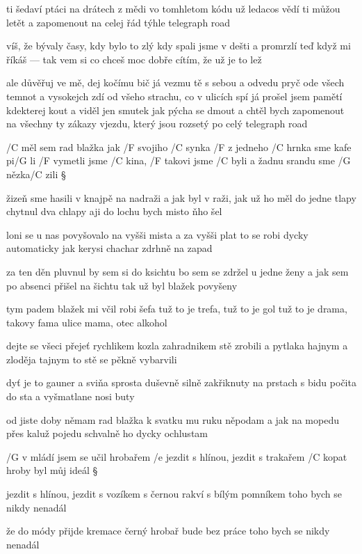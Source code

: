 ti šedaví ptáci na drátech z mědi
vo tomhletom kódu už ledacos vědí
ti můžou letět a zapomenout
na celej řád týhle telegraph road \songgg

víš, že bývaly časy, kdy bylo to zlý
kdy spali jsme v dešti a promrzlí
teď když mi říkáš --- tak vem si co chceš
moc dobře cítím, že už je to lež \s

ale důvěřuj ve mě, dej kočímu bič
já vezmu tě s sebou a odvedu pryč
ode všech temnot a vysokejch zdí
od všeho strachu, co v ulicích spí
já prošel jsem pamětí kdekterej kout
a viděl jen smutek jak pýcha se dmout
a chtěl bych zapomenout
na všechny ty zákazy vjezdu, který jsou rozsetý
po celý telegraph road




/C měl sem rad blažka jak /F svojiho /C synka
/F z jedneho /C hrnka sme kafe pi/G li
/F vymetli jsme /C kina, /F takovi jsme /C byli
a žadnu srandu sme /G nězka/C zili \S

žizeň sme hasili v knajpě na nadraži
a jak byl v raži, jak už ho měl
do jedne tlapy chytnul dva chlapy
aji do lochu bych misto ňho šel \s

loni se u nas povyšovalo
na vyšši mista a za vyšši plat
to se robi dycky automaticky
jak kerysi chachar zdrhně na zapad \s

za ten děn pluvnul by sem si do ksichtu
bo sem se zdržel u jedne ženy
a jak sem po absenci přišel na šichtu
tak už byl blažek povyšeny \s

tym padem blažek mi včil robi šefa
tuž to je trefa, tuž to je gol
tuž to je drama, takovy fama
ulice mama, otec alkohol \s

dejte se všeci přejeť rychlikem
kozla zahradnikem stě zrobili
a pytlaka hajnym a zloděja tajnym
to stě se pěkně vybarvili \s

dyť je to gauner a sviňa sprosta
duševně silně zakřiknuty
na prstach s bidu počita do sta
a vyšmatlane nosi buty \s

od jiste doby němam rad blažka
k svatku mu ruku něpodam
a jak na mopedu přes kaluž pojedu
schvalně ho dycky ochlustam \s




/G v mládí jsem se učil hrobařem
/e jezdit s hlínou, jezdit s trakařem
/C kopat hroby byl můj ideál \S

jezdit s hlínou, jezdit s vozíkem
s černou rakví s bílým pomníkem
toho bych se nikdy nenadál \s

že do módy přijde kremace
černý hrobař bude bez práce
toho bych se nikdy nenadál \s

